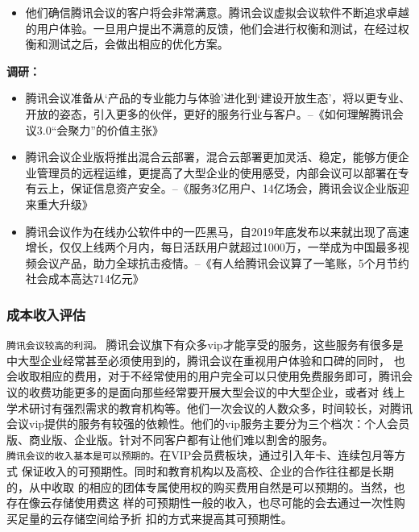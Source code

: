 \documentclass[a4paper,12pt]{article}
\begin{document}
\begin{itemize}
  \item 他们确信腾讯会议的客户将会非常满意。腾讯会议虚拟会议软件不断追求卓越的用户体验。一旦用户提出不满意的反馈，他们会进行权衡和测试，在经过权衡和测试之后，会做出相应的优化⽅案。
\end{itemize}
\textbf{调研：}
\begin{itemize}
    \item 腾讯会议准备从‘产品的专业能力与体验’进化到‘建设开放生态’，将以更专业、开放的姿态，引入更多的伙伴，更好的服务行业与客户。--《如何理解腾讯会议3.0“会聚力”的价值主张》
    \item 腾讯会议企业版将推出混合云部署，混合云部署更加灵活、稳定，能够方便企业管理员的远程运维，更提高了大型企业的使用感受，内部会议可以部署在专有云上，保证信息资产安全。--《服务3亿用户、14亿场会，腾讯会议企业版迎来重大升级》
    \item 腾讯会议作为在线办公软件中的一匹黑马，自2019年底发布以来就出现了高速增长，仅仅上线两个月内，每日活跃用户就超过1000万，一举成为中国最多视频会议产品，助力全球抗击疫情。--《有人给腾讯会议算了一笔账，5个月节约社会成本高达714亿元》
\end{itemize}
\subsubsection{成本收入评估}
\texttt{腾讯会议较高的利润。}
腾讯会议旗下有众多vip才能享受的服务，这些服务有很多是中大型企业经常甚至必须使用到的，腾讯会议在重视用户体验和口碑的同时，
也会收取相应的费用，对于不经常使用的用户完全可以只使用免费服务即可，腾讯会议的收费功能更多的是面向那些经常要开展大型会议的中大型企业，或者对
线上学术研讨有强烈需求的教育机构等。他们一次会议的人数众多，时间较长，对腾讯会议vip提供的服务有较强的依赖性。他们的vip服务主要分为三个档次：个人会员版、商业版、企业版。针对不同客户都有让他们难以割舍的服务。\\

\texttt{腾讯会议的收入基本是可以预期的。}在VIP会员费板块，通过引⼊年卡、连续包⽉等⽅式
保证收⼊的可预期性。同时和教育机构以及⾼校、企业的合作往往都是⻓期的，从中收取
的相应的团体专属使⽤权的购买费⽤⾃然是可以预期的。当然，也存在像云存储使⽤费这
样的可预期性⼀般的收⼊，也尽可能的会去通过⼀次性购买⾜量的云存储空间给予折
扣的⽅式来提⾼其可预期性。\\
\end{document}
